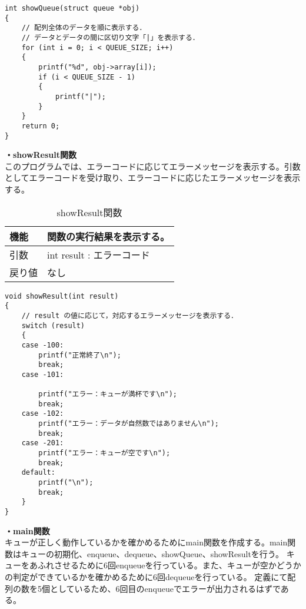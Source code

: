 \documentclass[dvipdfmx]{jsarticle}
\begin{document}
\begin{lstlisting}[caption={showQueue関数}, label={lst:showQueue_func_2}]
int showQueue(struct queue *obj)
{
    // 配列全体のデータを順に表示する．
    // データとデータの間に区切り文字「|」を表示する．
    for (int i = 0; i < QUEUE_SIZE; i++)
    {
        printf("%d", obj->array[i]);
        if (i < QUEUE_SIZE - 1)
        {
            printf("|");
        }
    }
    return 0;
}
\end{lstlisting}
\textbf{・showResult関数}\\
このプログラムでは、エラーコードに応じてエラーメッセージを表示する。引数としてエラーコードを受け取り、エラーコードに応じたエラーメッセージを表示する。
\begin{table}[ht]
  \centering
  \caption{showResult関数}
  \begin{tabular}{|p{5cm}|p{10cm}|}
    \hline
    機能  & 関数の実行結果を表示する。                                      \\
    \hline
    引数  & int result : エラーコード \\
    \hline
    戻り値 & なし \\
    \hline
  \end{tabular}
  \label{tab:showResult_func_2}
\end{table}
\begin{lstlisting}[caption={showResult関数}, label={lst:showResult_func_2}]
void showResult(int result)
{
    // result の値に応じて，対応するエラーメッセージを表示する．
    switch (result)
    {
    case -100:
        printf("正常終了\n");
        break;
    case -101:

        printf("エラー：キューが満杯です\n");
        break;
    case -102:
        printf("エラー：データが自然数ではありません\n");
        break;
    case -201:
        printf("エラー：キューが空です\n");
        break;
    default:
        printf("\n");
        break;
    }
}

\end{lstlisting}
\textbf{・main関数}\\
キューが正しく動作しているかを確かめるためにmain関数を作成する。main関数はキューの初期化、enqueue、dequeue、showQueue、showResultを行う。
キューをあふれさせるために6回enqueueを行っている。また、キューが空かどうかの判定ができているかを確かめるために6回dequeueを行っている。
定義にて配列の数を5個としているため、6回目のenqueueでエラーが出力されるはずである。
\end{document}
